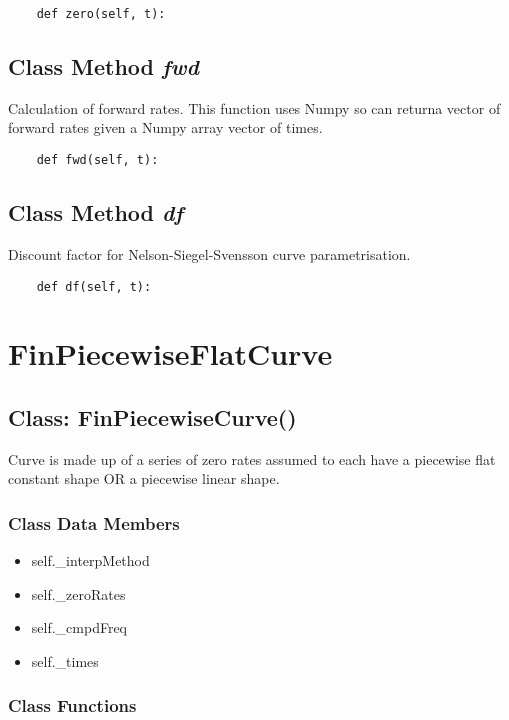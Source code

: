 \documentclass[twoside,11pt]{book}
\begin{document}
\begin{lstlisting}
    def zero(self, t):
\end{lstlisting}

\subsection{Class Method {\it fwd}}
Calculation of forward rates. This function uses Numpy so can returna vector of forward rates given a Numpy array vector of times. 

\begin{lstlisting}
    def fwd(self, t):
\end{lstlisting}

\subsection{Class Method {\it df}}
Discount factor for Nelson-Siegel-Svensson curve parametrisation. 

\begin{lstlisting}
    def df(self, t):
\end{lstlisting}

\newpage
\section{FinPiecewiseFlatCurve}

\subsection{Class: FinPiecewiseCurve()}
Curve is made up of a series of zero rates assumed to each have a piecewise flat constant shape OR a piecewise linear shape. 

\subsubsection{Class Data Members}
\begin{itemize}
\item{self.\_interpMethod}
\item{self.\_zeroRates}
\item{self.\_cmpdFreq}
\item{self.\_times}
\end{itemize}

\subsubsection{Class Functions}
\end{document}
